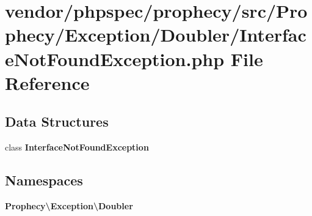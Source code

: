 \section{vendor/phpspec/prophecy/src/\+Prophecy/\+Exception/\+Doubler/\+Interface\+Not\+Found\+Exception.php File Reference}
\label{_interface_not_found_exception_8php}
\subsection*{Data Structures}
\begin{DoxyCompactItemize}
\item 
class {\bf Interface\+Not\+Found\+Exception}
\end{DoxyCompactItemize}
\subsection*{Namespaces}
\begin{DoxyCompactItemize}
\item 
 {\bf Prophecy\textbackslash{}\+Exception\textbackslash{}\+Doubler}
\end{DoxyCompactItemize}
